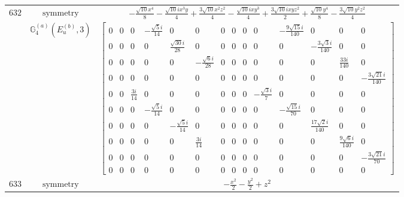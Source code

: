 \documentclass[fleqn,8pt,landscape]{jsarticle}
\begin{document}
\begin{longtable}{ccc}
$ 632 $ & $ \text{symmetry} $ & $ - \frac{\sqrt{10} x^{4}}{8} - \frac{\sqrt{10} i x^{3} y}{4} + \frac{3 \sqrt{10} x^{2} z^{2}}{4} - \frac{\sqrt{10} i x y^{3}}{4} + \frac{3 \sqrt{10} i x y z^{2}}{2} + \frac{\sqrt{10} y^{4}}{8} - \frac{3 \sqrt{10} y^{2} z^{2}}{4} $ \\
$  $ & $ \mathbb{G}_{4}^{(a)}(E_{u}^{(b)},3) $ & $ \begin{bmatrix} 0 & 0 & 0 & - \frac{\sqrt{5} i}{14} & 0 & 0 & 0 & 0 & 0 & 0 & - \frac{9 \sqrt{15} i}{140} & 0 & 0 & 0 \\ 0 & 0 & 0 & 0 & \frac{\sqrt{30} i}{28} & 0 & 0 & 0 & 0 & 0 & 0 & - \frac{3 \sqrt{3} i}{140} & 0 & 0 \\ 0 & 0 & 0 & 0 & 0 & - \frac{\sqrt{6} i}{28} & 0 & 0 & 0 & 0 & 0 & 0 & \frac{33 i}{140} & 0 \\ 0 & 0 & 0 & 0 & 0 & 0 & 0 & 0 & 0 & 0 & 0 & 0 & 0 & - \frac{3 \sqrt{21} i}{140} \\ 0 & 0 & \frac{3 i}{14} & 0 & 0 & 0 & 0 & 0 & 0 & - \frac{\sqrt{3} i}{7} & 0 & 0 & 0 & 0 \\ 0 & 0 & 0 & - \frac{\sqrt{5} i}{14} & 0 & 0 & 0 & 0 & 0 & 0 & - \frac{\sqrt{15} i}{70} & 0 & 0 & 0 \\ 0 & 0 & 0 & 0 & - \frac{\sqrt{5} i}{14} & 0 & 0 & 0 & 0 & 0 & 0 & \frac{17 \sqrt{2} i}{140} & 0 & 0 \\ 0 & 0 & 0 & 0 & 0 & \frac{3 i}{14} & 0 & 0 & 0 & 0 & 0 & 0 & \frac{9 \sqrt{6} i}{140} & 0 \\ 0 & 0 & 0 & 0 & 0 & 0 & 0 & 0 & 0 & 0 & 0 & 0 & 0 & - \frac{3 \sqrt{21} i}{70} \\ 0 & 0 & 0 & 0 & 0 & 0 & 0 & 0 & 0 & 0 & 0 & 0 & 0 & 0 \end{bmatrix} $ \\ \hline
$ 633 $ & $ \text{symmetry} $ & $ - \frac{x^{2}}{2} - \frac{y^{2}}{2} + z^{2} $ \\

\end{longtable}
\end{document}
